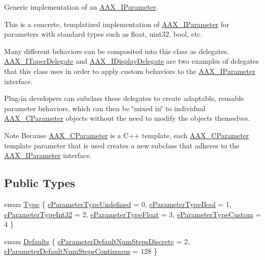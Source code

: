 Generic implementation of an \mbox{\hyperlink{a01857}{A\+A\+X\+\_\+\+I\+Parameter}}. 

This is a concrete, templatized implementation of \mbox{\hyperlink{a01857}{A\+A\+X\+\_\+\+I\+Parameter}} for parameters with standard types such as {\ttfamily float}, {\ttfamily uint32}, {\ttfamily bool}, etc.

Many different behaviors can be composited into this class as delegates. \mbox{\hyperlink{a01881}{A\+A\+X\+\_\+\+I\+Taper\+Delegate}} and \mbox{\hyperlink{a01801}{A\+A\+X\+\_\+\+I\+Display\+Delegate}} are two examples of delegates that this class uses in order to apply custom behaviors to the \mbox{\hyperlink{a01857}{A\+A\+X\+\_\+\+I\+Parameter}} interface.

Plug-\/in developers can subclass these delegates to create adaptable, reusable parameter behaviors, which can then be \char`\"{}mixed in\char`\"{} to individual \mbox{\hyperlink{a01537}{A\+A\+X\+\_\+\+C\+Parameter}} objects without the need to modify the objects themselves.

\begin{DoxyNote}{Note}
Because \mbox{\hyperlink{a01537}{A\+A\+X\+\_\+\+C\+Parameter}} is a C++ template, each \mbox{\hyperlink{a01537}{A\+A\+X\+\_\+\+C\+Parameter}} template parameter that is used creates a new subclass that adheres to the \mbox{\hyperlink{a01857}{A\+A\+X\+\_\+\+I\+Parameter}} interface. 
\end{DoxyNote}
\subsection*{Public Types}
\begin{DoxyCompactItemize}
\item 
enum \mbox{\hyperlink{a01537_a04704f13b4367b9e7430217d06c5e4bd}{Type}} \{ \newline
\mbox{\hyperlink{a01537_a04704f13b4367b9e7430217d06c5e4bda15a8b9cd0a4d3acf30c476c7924b1753}{e\+Parameter\+Type\+Undefined}} = 0, 
\mbox{\hyperlink{a01537_a04704f13b4367b9e7430217d06c5e4bda9ae3d0eca8e95a572dba6daaf52144c0}{e\+Parameter\+Type\+Bool}} = 1, 
\mbox{\hyperlink{a01537_a04704f13b4367b9e7430217d06c5e4bda28e7aa1254f43cd377f0a0b9d2f29306}{e\+Parameter\+Type\+Int32}} = 2, 
\mbox{\hyperlink{a01537_a04704f13b4367b9e7430217d06c5e4bda82c99fa80b68022242f17adbc1dbf0dc}{e\+Parameter\+Type\+Float}} = 3, 
\newline
\mbox{\hyperlink{a01537_a04704f13b4367b9e7430217d06c5e4bda3503351122f63c767ca33d70aef69557}{e\+Parameter\+Type\+Custom}} = 4
 \}
\item 
enum \mbox{\hyperlink{a01537_a6bd5a5ddc796fa3a9de77157bf444ca8}{Defaults}} \{ \mbox{\hyperlink{a01537_a6bd5a5ddc796fa3a9de77157bf444ca8a511ee79dc3b6322b2facb41b2663be30}{e\+Parameter\+Default\+Num\+Steps\+Discrete}} = 2, 
\mbox{\hyperlink{a01537_a6bd5a5ddc796fa3a9de77157bf444ca8a54c0d050e5b34d4eb85c840168ec4567}{e\+Parameter\+Default\+Num\+Steps\+Continuous}} = 128
 \}
\end{DoxyCompactItemize}
